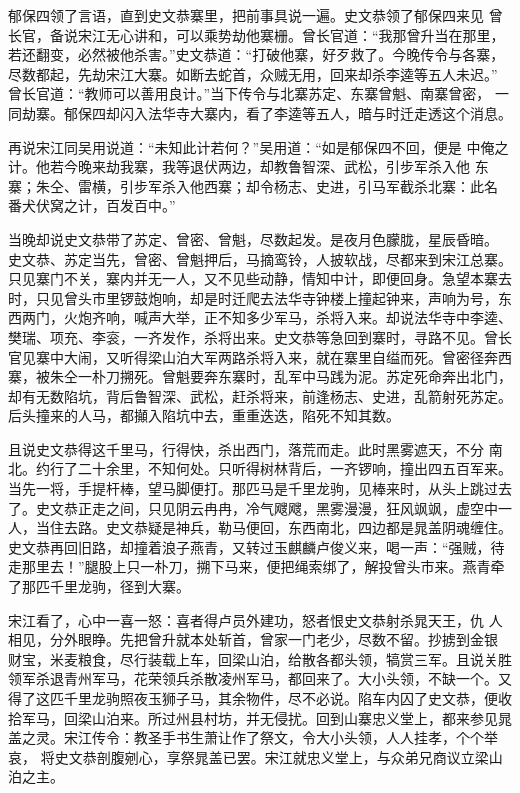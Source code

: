 郁保四领了言语，直到史文恭寨里，把前事具说一遍。史文恭领了郁保四来见
曾长官，备说宋江无心讲和，可以乘势劫他寨栅。曾长官道：“我那曾升当在那里，
若还翻变，必然被他杀害。”史文恭道：“打破他寨，好歹救了。今晚传令与各寨，
尽数都起，先劫宋江大寨。如断去蛇首，众贼无用，回来却杀李逵等五人未迟。”
曾长官道：“教师可以善用良计。”当下传令与北寨苏定、东寨曾魁、南寨曾密，
一同劫寨。郁保四却闪入法华寺大寨内，看了李逵等五人，暗与时迁走透这个消息。

再说宋江同吴用说道：“未知此计若何？”吴用道：“如是郁保四不回，便是
中俺之计。他若今晚来劫我寨，我等退伏两边，却教鲁智深、武松，引步军杀入他
东寨；朱仝、雷横，引步军杀入他西寨；却令杨志、史进，引马军截杀北寨：此名
番犬伏窝之计，百发百中。”

当晚却说史文恭带了苏定、曾密、曾魁，尽数起发。是夜月色朦胧，星辰昏暗。
史文恭、苏定当先，曾密、曾魁押后，马摘鸾铃，人披软战，尽都来到宋江总寨。
只见寨门不关，寨内并无一人，又不见些动静，情知中计，即便回身。急望本寨去
时，只见曾头市里锣鼓炮响，却是时迁爬去法华寺钟楼上撞起钟来，声响为号，东
西两门，火炮齐响，喊声大举，正不知多少军马，杀将入来。却说法华寺中李逵、
樊瑞、项充、李衮，一齐发作，杀将出来。史文恭等急回到寨时，寻路不见。曾长
官见寨中大闹，又听得梁山泊大军两路杀将入来，就在寨里自缢而死。曾密径奔西
寨，被朱仝一朴刀搠死。曾魁要奔东寨时，乱军中马践为泥。苏定死命奔出北门，
却有无数陷坑，背后鲁智深、武松，赶杀将来，前逢杨志、史进，乱箭射死苏定。
后头撞来的人马，都攧入陷坑中去，重重迭迭，陷死不知其数。

且说史文恭得这千里马，行得快，杀出西门，落荒而走。此时黑雾遮天，不分
南北。约行了二十余里，不知何处。只听得树林背后，一齐锣响，撞出四五百军来。
当先一将，手提杆棒，望马脚便打。那匹马是千里龙驹，见棒来时，从头上跳过去
了。史文恭正走之间，只见阴云冉冉，冷气飕飕，黑雾漫漫，狂风飒飒，虚空中一
人，当住去路。史文恭疑是神兵，勒马便回，东西南北，四边都是晁盖阴魂缠住。
史文恭再回旧路，却撞着浪子燕青，又转过玉麒麟卢俊义来，喝一声：“强贼，待
走那里去！”腿股上只一朴刀，搠下马来，便把绳索绑了，解投曾头市来。燕青牵
了那匹千里龙驹，径到大寨。

宋江看了，心中一喜一怒：喜者得卢员外建功，怒者恨史文恭射杀晁天王，仇
人相见，分外眼睁。先把曾升就本处斩首，曾家一门老少，尽数不留。抄掳到金银
财宝，米麦粮食，尽行装载上车，回梁山泊，给散各都头领，犒赏三军。且说关胜
领军杀退青州军马，花荣领兵杀散凌州军马，都回来了。大小头领，不缺一个。又
得了这匹千里龙驹照夜玉狮子马，其余物件，尽不必说。陷车内囚了史文恭，便收
拾军马，回梁山泊来。所过州县村坊，并无侵扰。回到山寨忠义堂上，都来参见晁
盖之灵。宋江传令：教圣手书生萧让作了祭文，令大小头领，人人挂孝，个个举哀，
将史文恭剖腹剜心，享祭晁盖已罢。宋江就忠义堂上，与众弟兄商议立梁山泊之主。

